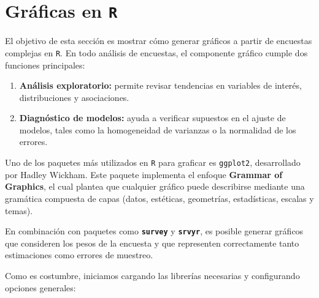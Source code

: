 \documentclass[
  12pt,
]{book}
\newenvironment{Shaded}{\begin{snugshade}}{\end{snugshade}}
\newcommand{\AttributeTok}[1]{\textcolor[rgb]{0.13,0.29,0.53}{#1}}
\newcommand{\CommentTok}[1]{\textcolor[rgb]{0.56,0.35,0.01}{\textit{#1}}}
\newcommand{\DecValTok}[1]{\textcolor[rgb]{0.00,0.00,0.81}{#1}}
\newcommand{\FunctionTok}[1]{\textcolor[rgb]{0.13,0.29,0.53}{\textbf{#1}}}
\newcommand{\NormalTok}[1]{#1}
\providecommand{\tightlist}{%
  \setlength{\itemsep}{0pt}\setlength{\parskip}{0pt}}
\begin{document}
\section{\texorpdfstring{Gráficas en \texttt{R}}{Gráficas en R}}\label{gruxe1ficas-en-r}

El objetivo de esta sección es mostrar cómo generar gráficos a partir de encuestas complejas en \texttt{R}. En todo análisis de encuestas, el componente gráfico cumple dos funciones principales:

\begin{enumerate}
\def\labelenumi{\arabic{enumi}.}
\tightlist
\item
  \textbf{Análisis exploratorio:} permite revisar tendencias en variables de interés, distribuciones y asociaciones.
\item
  \textbf{Diagnóstico de modelos:} ayuda a verificar supuestos en el ajuste de modelos, tales como la homogeneidad de varianzas o la normalidad de los errores.
\end{enumerate}

Uno de los paquetes más utilizados en \texttt{R} para graficar es \texttt{ggplot2}, desarrollado por Hadley Wickham. Este paquete implementa el enfoque \textbf{Grammar of Graphics}, el cual plantea que cualquier gráfico puede describirse mediante una gramática compuesta de capas (datos, estéticas, geometrías, estadísticas, escalas y temas).

En combinación con paquetes como \textbf{\texttt{survey}} y \textbf{\texttt{srvyr}}, es posible generar gráficos que consideren los pesos de la encuesta y que representen correctamente tanto estimaciones como errores de muestreo.

Como es costumbre, iniciamos cargando las librerías necesarias y configurando opciones generales:

\begin{Shaded}
\end{Shaded}
\end{document}
